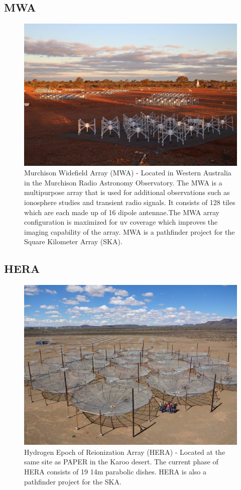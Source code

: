 \documentclass[a0,landscape]{a0poster}
\begin{document}
\begin{multicols}{4}
\subsection*{MWA}
\begin{figure}[H]
\centering
\label{fig:MWA}
\includegraphics[width=0.6\linewidth]{figures/phaseII_tiles.jpg}
\caption{Murchison Widefield Array (MWA) - Located in Western Australia in the Murchison Radio Astronomy Observatory. The MWA is a multipurpose array that is used for additional observations such as ionosphere studies and transient radio signals. It consists of 128 tiles which are each made up of 16 dipole antennae.The MWA array configuration is maximized for uv coverage which improves the imaging capability of the array. MWA is a pathfinder project for the Square Kilometer Array (SKA).}
\end{figure}

\subsection*{HERA}
\begin{figure}[H]
\centering
\label{fig:HERA}
\includegraphics[width=0.6\linewidth]{figures/HERA19.png}
\caption{Hydrogen Epoch of Reionization Array (HERA) - Located at the same site as PAPER in the Karoo desert. The current phase of HERA consists of 19 14m parabolic dishes. HERA is also a pathfinder project for the SKA.}
\end{figure}


\end{multicols}
\end{document}
